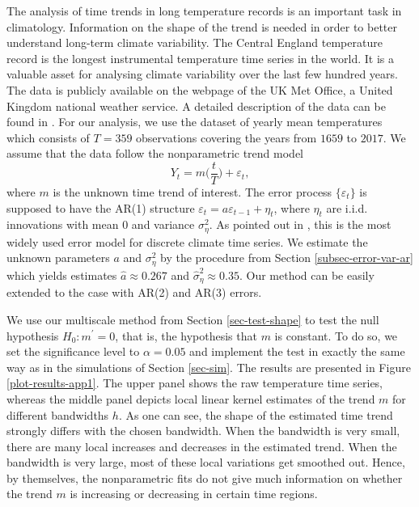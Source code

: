 The analysis of time trends in long temperature records is an important task in climatology. Information on the shape of the trend is needed in order to better understand long-term climate variability. The Central England temperature record is the longest instrumental temperature time series in the world. It is a valuable asset for analysing climate variability over the last few hundred years. The data is publicly available on the webpage of the UK Met Office, a United Kingdom national weather service. A detailed description of the data can be found in \cite{Parker1992}. For our analysis, we use the dataset of yearly mean temperatures which consists of $T=359$ observations covering the years from $1659$ to $2017$. We assume that the data follow the nonparametric trend model 
\[ Y_t = m\Big(\frac{t}{T}\Big) + \varepsilon_t, \]
where $m$ is the unknown time trend of interest. The error process $\{ \varepsilon_t \}$ is supposed to have the AR(1) structure $\varepsilon_t = a \varepsilon_{t-1} + \eta_t$, where $\eta_t$ are i.i.d. innovations with mean $0$ and variance $\sigma_\eta^2$. As pointed out in \cite{Mudelsee2010}, this is the most widely used error model for discrete climate time series. We estimate the unknown parameters $a$ and $\sigma_\eta^2$ by the procedure from Section \ref{subsec-error-var-ar} which yields estimates $\widehat{a} \approx 0.267$ and $\widehat{\sigma}_\eta^2 \approx 0.35$. Our method can be easily extended to the case with AR(2) and AR(3) errors.


We use our multiscale method from Section \ref{sec-test-shape} to test the null hypothesis $H_0: m^\prime = 0$, that is, the hypothesis that $m$ is constant. To do so, we set the significance level to $\alpha = 0.05$ and implement the test in exactly the same way as in the simulations of Section \ref{sec-sim}. The results are presented in Figure \ref{plot-results-app1}. The upper panel shows the raw temperature time series, whereas the middle panel depicts local linear kernel estimates of the trend $m$ for different bandwidths $h$. As one can see, the shape of the estimated time trend strongly differs with the chosen bandwidth. When the bandwidth is very small, there are many local increases and decreases in the estimated trend. When the bandwidth is very large, most of these local variations get smoothed out. Hence, by themselves, the nonparametric fits do not give much information on whether the trend $m$ is increasing or decreasing in certain time regions. 


